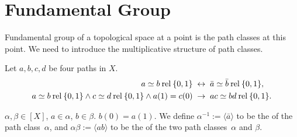 \documentclass[openany, oneside, a5paper]{book}
\newcommand*{\rel}{\mathbin{\mathrm{rel}}}
\newcommand*{\pclass}[1]{\langle{#1}\rangle}    %
\begin{document}
\section{Fundamental Group}

Fundamental group of a topological space at a point is the path classes at this point.
We need to introduce the multiplicative structure of path classes.

\begin{theorem}
    Let $a, b, c, d$ be four paths in $X$.
    \begin{align}
        a \simeq b \rel \{0, 1\} &\IFF \bar a \simeq \bar b \rel \{0, 1\}, \\
        a \simeq b \rel \{0, 1\} \wedge c \simeq d \rel \{0, 1\} \wedge a(1) = c(0) &\then ac \simeq bd \rel \{0, 1\}.
    \end{align}
\end{theorem}

\begin{definition}
    $\alpha, \beta \in [X]$, $a \in \alpha$, $b \in \beta$.
    $b(0) = a(1)$.
    We define $\alpha^{-1} := \pclass{\bar a}$ to be the  of the path class~$\alpha$, and $\alpha \beta := \langle ab \rangle$ to be the  of the two path classes~$\alpha$ and $\beta$.
\end{definition}
\end{document}
